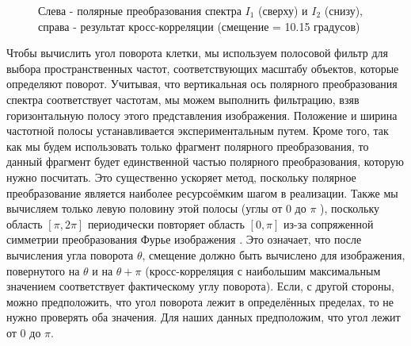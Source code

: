 \documentclass[oneside,final,14pt]{extreport}
\begin{document}
\begin{figure}[h!]
\begin{minipage}[h]{0.49\linewidth}
\end{minipage}
\begin{minipage}[h]{0.49\linewidth}
\end{minipage}
\caption{Слева - полярные преобразования спектра \( I_\text{1} \) (сверху) и  \( I_\text{2} \) (снизу), справа - результат кросс-корреляции (смещение = 10.15 градусов) }
\end{figure}

Чтобы вычислить угол поворота клетки, мы используем полосовой фильтр для выбора пространственных частот, соответствующих масштабу объектов, которые определяют поворот. Учитывая, что вертикальная ось полярного преобразования спектра соответствует частотам, мы можем выполнить фильтрацию, взяв горизонтальную полосу этого представления изображения. Положение и ширина частотной полосы устанавливается экспериментальным путем. Кроме того, так как мы будем использовать только фрагмент полярного преобразования, то данный фрагмент будет единственной частью полярного преобразования, которую нужно посчитать. Это существенно ускоряет метод, поскольку полярное преобразование является наиболее ресурсоёмким шагом в реализации.
Также мы вычисляем только левую половину этой полосы (углы от 0 до \(\pi\) ), поскольку область \([\pi,2\pi]\) периодически повторяет область \([0,\pi]\) из-за сопряженной симметрии преобразования Фурье изображения \cite{sheng1986experiments}. Это означает, что после вычисления угла поворота \(\theta\),  смещение должно быть вычислено для изображения, повернутого на \(\theta\) и на \(\theta + \pi\) (кросс-корреляция с наибольшим максимальным значением соответствует фактическому углу поворота). Если, с другой стороны, можно предположить, что угол поворота лежит в определённых пределах, то не нужно проверять оба значения. Для наших данных предположим, что угол лежит от \(0\) до \(\pi\).
\end{document}
